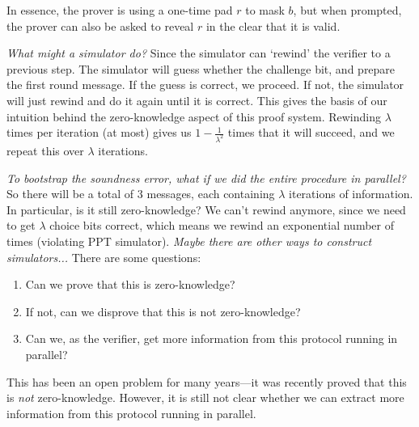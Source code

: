 In essence, the prover is using a one-time pad $r$ to mask $b$, but when prompted, the prover can also be asked to reveal $r$ in the clear that it is valid.

\emph{What might a simulator do?} Since the simulator can `rewind' the verifier to a previous step. The simulator will guess whether the challenge bit, and prepare the first round message. If the guess is correct, we proceed. If not, the simulator will just rewind and do it again until it is correct. This gives the basis of our intuition behind the zero-knowledge aspect of this proof system. Rewinding $\lambda$ times per iteration (at most) gives us $1 - \frac{1}{\lambda^2}$ times that it will succeed, and we repeat this over $\lambda$ iterations.

\emph{To bootstrap the soundness error, what if we did the entire procedure in parallel?} So there will be a total of $3$ messages, each containing $\lambda$ iterations of information. In particular, is it still zero-knowledge? We can't rewind anymore, since we need to get $\lambda$ choice bits correct, which means we rewind an exponential number of times (violating PPT simulator). \emph{Maybe there are other ways to construct simulators...} There are some questions:
\begin{enumerate}
    \item Can we prove that this is zero-knowledge?
    \item If not, can we disprove that this is not zero-knowledge?
    \item Can we, as the verifier, get more information from this protocol running in parallel?
\end{enumerate}
This has been an open problem for many years---it was recently proved that this is \emph{not} zero-knowledge. However, it is still not clear whether we can extract more information from this protocol running in parallel.